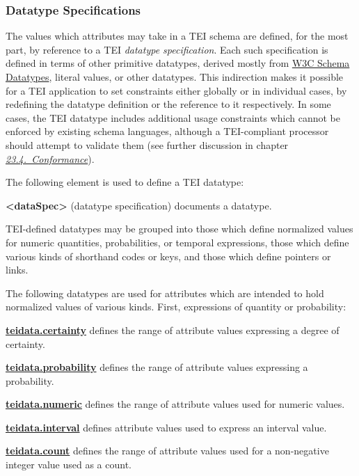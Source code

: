 \subsubsection[{Datatype Specifications}]{Datatype Specifications}\label{DTYPES}\par
The values which attributes may take in a TEI schema are defined, for the most part, by reference to a TEI \textit{datatype specification}. Each such specification is defined in terms of other primitive datatypes, derived mostly from \hyperref[XSD2]{W3C Schema Datatypes}, literal values, or other datatypes. This indirection makes it possible for a TEI application to set constraints either globally or in individual cases, by redefining the datatype definition or the reference to it respectively. In some cases, the TEI datatype includes additional usage constraints which cannot be enforced by existing schema languages, although a TEI-compliant processor should attempt to validate them (see further discussion in chapter \textit{\hyperref[CF]{23.4.\ Conformance}}).\par
The following element is used to define a TEI datatype: 
\begin{sansreflist}
  
\item [\textbf{<dataSpec>}] (datatype specification) documents a datatype.
\end{sansreflist}
\par
TEI-defined datatypes may be grouped into those which define normalized values for numeric quantities, probabilities, or temporal expressions, those which define various kinds of shorthand codes or keys, and those which define pointers or links.\par
The following datatypes are used for attributes which are intended to hold normalized values of various kinds. First, expressions of quantity or probability: 
\begin{sansreflist}
  
\item {\bfseries \hyperref[TEI.teidata.certainty]{teidata.certainty}} defines the range of attribute values expressing a degree of certainty.
\item {\bfseries \hyperref[TEI.teidata.probability]{teidata.probability}} defines the range of attribute values expressing a probability.
\item {\bfseries \hyperref[TEI.teidata.numeric]{teidata.numeric}} defines the range of attribute values used for numeric values.
\item {\bfseries \hyperref[TEI.teidata.interval]{teidata.interval}} defines attribute values used to express an interval value.
\item {\bfseries \hyperref[TEI.teidata.count]{teidata.count}} defines the range of attribute values used for a non-negative integer value used as a count.
\end{sansreflist}
